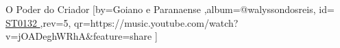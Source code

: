 \beginsong
{O Poder do Criador %
}[by={Goiano e Paranaense %
},album={@walyssondosreis},
id={\href{https://music.youtube.com/watch?v=jOADeghWRhA&feature=share
}{ ST0132 %
}},rev={5}, %
qr={https://music.youtube.com/watch?v=jOADeghWRhA&feature=share %
}]

\lstset{basicstyle=\scriptsize\bf} %

